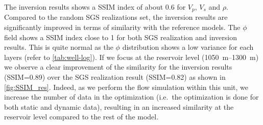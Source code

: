 The inversion results shows a SSIM index of about \num{0.6} for $V_p$, $V_s$ and
$\rho$. Compared to the random SGS realizations set, the inversion results are
significantly improved in terms of similarity with the reference models. The
$\phi$ field shows a SSIM index close to \num{1} for both SGS realization and
inversion results. This is quite normal as the $\phi$ distribution shows a low
variance for each layers (refer to \cref{tab:well-log}). If we focus at the
reservoir level (\SIrange{1050}{1300}{\metre}) we observe a clear improvement of
the similarity for the inversion results (SSIM=\num{0.89}) over the SGS
realization result (SSIM=\num{0.82}) as shown in \cref{fig:SSIM_res}. Indeed, as
we perform the  flow simulation within this unit, we increase the number
of data in the optimization (i.e.\ the optimization is done for both static and
dynamic data), resulting in an increased similarity at the reservoir level
compared to the rest of the model.
